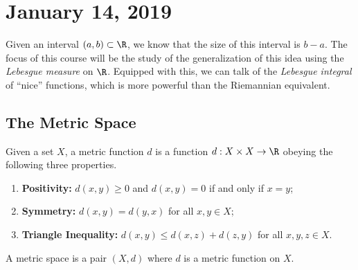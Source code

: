 
\section{January 14, 2019}

Given an interval $(a,b) \subset \R$, we know that the size of this interval is $b-a$. The focus of this course will be the study of the generalization of this idea using the \emph{Lebesgue measure} on $\R$. Equipped with this, we can talk of the \emph{Lebesgue integral} of ``nice'' functions, which is more powerful than the Riemannian equivalent.

\subsection{The Metric Space}

\begin{definition}
Given a set $X$, a metric function $d$ is a function $d : X \times X \to \R$ obeying the following three properties.
\begin{enumerate}
\item \textbf{Positivity:} $d(x,y) \geq 0$ and $d(x,y) = 0$ if and only if $x = y$;
\item \textbf{Symmetry:} $d(x,y) = d(y,x)$ for all $x,y \in X$;
\item \textbf{Triangle Inequality:} $d(x,y) \leq d(x,z) + d(z,y)$ for all $x,y,z \in X$. 
\end{enumerate}
A metric space is a pair $(X,d)$ where $d$ is a metric function on $X$.
\end{definition}

